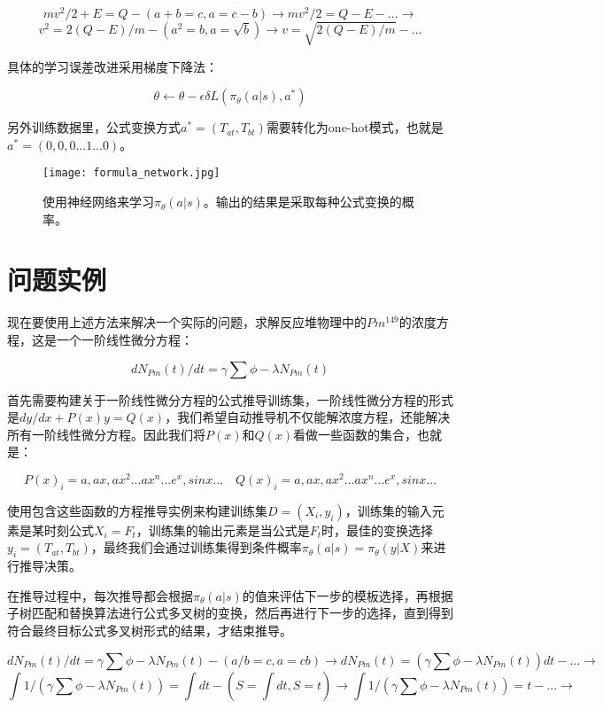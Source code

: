 \documentclass[runningheads]{llncs}
\begin{document}
$$mv^2/2+E=Q -(a+b=c,a=c-b)\to mv^2/2=Q-E -...\to $$
$$v^2=2(Q-E)/m -(a^2=b,a=\sqrt b)\to v=\sqrt{ 2(Q-E)/m}-...$$

具体的学习误差改进采用梯度下降法：

$$\theta \leftarrow \theta - \epsilon \delta L(\pi_{\theta}(a|s),a^*)$$

另外训练数据里，公式变换方式$a^*=(T_{at},T_{bt})$需要转化为one-hot模式，也就是$a^*=(0,0,0...1...0)$。

\begin{figure}[H]
\centering
\texttt{[image: formula\_network.jpg]}
\caption{使用神经网络来学习$\pi_{\theta}(a|s)$。输出的结果是采取每种公式变换的概率。}
\end{figure}












\section{问题实例}
现在要使用上述方法来解决一个实际的问题，求解反应堆物理中的$Pm^{149}$的浓度方程，这是一个一阶线性微分方程：

$$dN_{Pm}(t)/dt = \gamma \sum \phi - \lambda N_{Pm}(t) $$

首先需要构建关于一阶线性微分方程的公式推导训练集，一阶线性微分方程的形式是$dy/dx + P(x)y = Q(x) $，我们希望自动推导机不仅能解浓度方程，还能解决所有一阶线性微分方程。因此我们将$P(x) $和$Q(x) $看做一些函数的集合，也就是：

$${P(x)_i}={a,ax,ax^2...ax^n...e^x,sinx...} \quad {Q(x)_i}={a,ax,ax^2...ax^n...e^x,sinx...} $$

使用包含这些函数的方程推导实例来构建训练集$D={(X_i,y_i)}$，训练集的输入元素是某时刻公式$X_i=F_t$，训练集的输出元素是当公式是$F_t$时，最佳的变换选择$y_i=(T_{at},T_{bt})$，最终我们会通过训练集得到条件概率$\pi_{\theta}(a|s)=\pi_{\theta}(y|X)$来进行推导决策。

在推导过程中，每次推导都会根据$\pi_{\theta}(a|s)$的值来评估下一步的模板选择，再根据子树匹配和替换算法进行公式多叉树的变换，然后再进行下一步的选择，直到得到符合最终目标公式多叉树形式的结果，才结束推导。

$$dN_{Pm}(t)/dt = \gamma \sum \phi - \lambda N_{Pm}(t)    -(a/b=c,a=cb)\to    dN_{Pm}(t)=(\gamma \sum \phi - \lambda N_{Pm}(t))dt  -...\to   $$
$$\int{1/(\gamma \sum \phi-\lambda N_{Pm}(t))}=\int{dt} -(S=\int{dt},S=t)\to  \int{1/(\gamma \sum \phi-\lambda N_{Pm}(t))}=t  -...\to  $$
\end{document}
